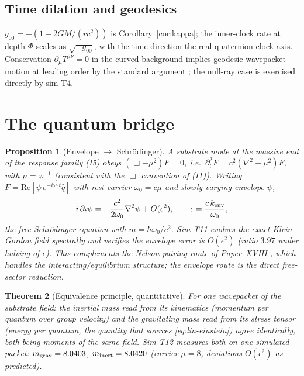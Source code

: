 \documentclass[12pt]{article}
\newtheorem{theorem}{Theorem}
\newtheorem{proposition}[theorem]{Proposition}
\theoremstyle{definition}
\theoremstyle{remark}
\begin{document}
\subsection{Time dilation and geodesics}
$g_{00} = -(1 - 2GM/(rc^2))$ is Corollary~\ref{cor:kappa}; the inner-clock rate at depth $\Phi$ scales as $\sqrt{-g_{00}}$, with the time direction the real-quaternion clock axis. Conservation $\partial_\mu T^{\mu\nu} = 0$ in the curved background implies geodesic wavepacket motion at leading order by the standard argument \citep{GerochJang1975}; the null-ray case is exercised directly by sim T4.

\section{The quantum bridge}\label{sec:qm}

\begin{proposition}[Envelope $\to$ Schr\"odinger]\label{prop:schrodinger}
A substrate mode at the massive end of the response family (I5) obeys $(\Box - \mu^2)F = 0$, i.e.\ $\partial_t^2 F = c^2(\nabla^2 - \mu^2)F$, with $\mu = \varphi^{-1}$ (consistent with the $\Box$ convention of (I1)). Writing $F = \mathrm{Re}[\psi\,e^{-i\omega_0 t}\hat q]$ with rest carrier $\omega_0 = c\mu$ and slowly varying envelope $\psi$,
\begin{equation}
i\,\partial_t\psi = -\frac{c^2}{2\omega_0}\nabla^2\psi + O(\epsilon^2), \qquad \epsilon = \frac{c\,k_{\rm env}}{\omega_0},
\end{equation}
the free Schr\"odinger equation with $m = \hbar\omega_0/c^2$. Sim T11 evolves the exact Klein--Gordon field spectrally and verifies the envelope error is $O(\epsilon^2)$ (ratio $3.97$ under halving of $\epsilon$). This complements the Nelson-pairing route of Paper~XVIII \citep{SmartXVIII}, which handles the interacting/equilibrium structure; the envelope route is the direct free-sector reduction.
\end{proposition}

\begin{theorem}[Equivalence principle, quantitative]\label{thm:equiv}
For one wavepacket of the substrate field: the inertial mass read from its kinematics (momentum per quantum over group velocity) and the gravitating mass read from its stress tensor (energy per quantum, the quantity that sources \eqref{eq:lin-einstein}) agree identically, both being moments of the same field. Sim T12 measures both on one simulated packet: $m_{\rm grav} = 8.0403$, $m_{\rm inert} = 8.0420$ (carrier $\mu = 8$, deviations $O(\epsilon^2)$ as predicted).
\end{theorem}
\end{document}
